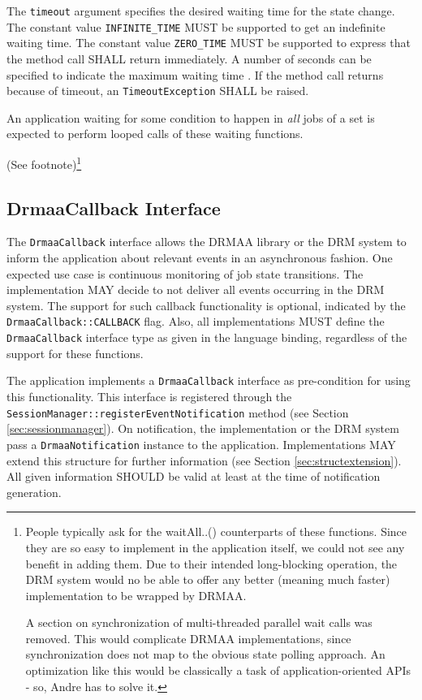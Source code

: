 \documentclass{article}
\newcommand{\h}[1]{\lstinline|#1|}
\newcommand{\rat}[1]{ {\tiny(See footnote)}\footnote{#1} }
\begin{document}
The \h{timeout} argument specifies the desired waiting time for the state change. The constant value \h{INFINITE_TIME} MUST be supported to get an indefinite waiting time. The constant value \h{ZERO_TIME} MUST be supported to express that the method call SHALL return immediately. A number of seconds can be specified to indicate the maximum waiting time . If the method call returns because of timeout, an \h{TimeoutException} SHALL be raised. 

An application waiting for some condition to happen in \emph{all} jobs of a set is expected to perform looped calls of these waiting functions. 

\rat{
People typically ask for the waitAll..() counterparts of these functions. Since they are so easy to implement in the application itself, we could not see any benefit in adding them. Due to their intended long-blocking operation, the DRM system would no be able to offer any better (meaning much faster) implementation to be wrapped by DRMAA.

A section on synchronization of multi-threaded parallel wait calls was removed. This would complicate DRMAA implementations, since synchronization does not map to the obvious state polling approach. An optimization like this would be classically a task of application-oriented APIs - so, Andre has to solve it.
}

\subsection{DrmaaCallback Interface}
\label{sec:drmaacallback}

The \h{DrmaaCallback} interface allows the DRMAA library or the DRM system to inform the application about relevant events in an asynchronous fashion. One expected use case is continuous monitoring of job state transitions. The implementation MAY decide to not deliver all events occurring in the DRM system. The support for such callback functionality is optional, indicated by the \h{DrmaaCallback::CALLBACK} flag. Also, all implementations MUST define the \h{DrmaaCallback} interface type as given in the language binding, regardless of the support for these functions.





The application implements a \h{DrmaaCallback} interface as pre-condition for using this functionality. This interface is registered through the \h{SessionManager::registerEventNotification} method (see Section \ref{sec:sessionmanager}). On notification, the implementation or the DRM system pass a \h{DrmaaNotification} instance to the application. Implementations MAY extend this structure for further information (see Section \ref{sec:structextension}). All given information SHOULD be valid at least at the time of notification generation. 
\end{document}
